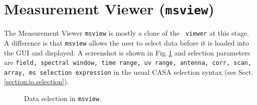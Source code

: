 \section{Measurement Viewer ({\tt msview})}
\label{section:display.msview}

The Measurement Viewer {\tt msview} is mostly a clone of the {\tt
  viewer} at this stage. A difference is that {\tt msview} allows the
user to select data before it is loaded into the GUI and displayed. A
screenshot is shown in Fig.\,\ref{fig:msview-selection} and selection
parameters are {\tt field, spectral window, time range, uv range,
  antenna, corr, scan, array, ms selection expression} in the usual
CASA selection syntax (see Sect.\,\ref{section:io.selection}). 


\begin{figure}[h!]
\begin{center}
\caption{\label{fig:msview-selection} Data selection in {\tt msview}.}
\hrulefill
\end{center}
\end{figure}
 